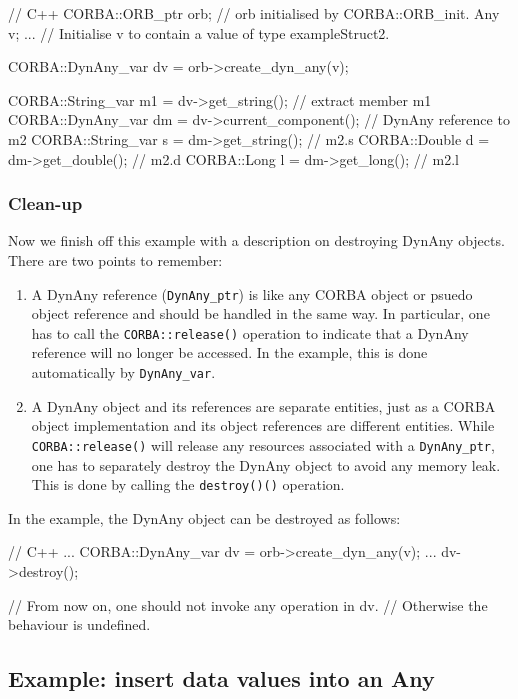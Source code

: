 \documentclass[11pt,twoside,a4paper]{book}
\newcommand{\type}[1]{\texttt{#1}}
\newcommand{\op}[1]{\texttt{#1()}}
\newcommand{\dsc}{\discretionary{}{}{}}
\begin{document}
\begin{cxxlisting}
// C++
CORBA::ORB_ptr orb;  // orb initialised by CORBA::ORB_init.
Any v;
...       // Initialise v to contain a value of type exampleStruct2.

CORBA::DynAny_var dv = orb->create_dyn_any(v);

CORBA::String_var m1 = dv->get_string();  // extract member m1
CORBA::DynAny_var dm = dv->current_component(); // DynAny reference to m2
CORBA::String_var s = dm->get_string();   // m2.s
CORBA::Double     d = dm->get_double();   // m2.d
CORBA::Long       l = dm->get_long();     // m2.l
\end{cxxlisting}


\subsubsection{Clean-up}
Now we finish off this example with a description on destroying DynAny
objects. There are two points to remember:

\begin{enumerate}
\item A DynAny reference (\type{DynAny\_ptr}) is like any CORBA object
or psuedo object reference and should be handled in the same way. In
particular, one has to call the \op{CORBA::release} operation to
indicate that a DynAny reference will no longer be accessed. In the
example, this is done automatically by \type{DynAny\_var}.

\item A DynAny object and its references are separate entities, just
as a CORBA object implementation and its object references are
different entities. While \op{CORBA::release} will release any
resources associated with a \type{DynAny\_\dsc{}ptr}, one has to
separately destroy the DynAny object to avoid any memory leak. This is
done by calling the \op{destroy()} operation.
\end{enumerate}

In the example, the DynAny object can be destroyed as follows:

\begin{cxxlisting}
// C++
...
CORBA::DynAny_var dv = orb->create_dyn_any(v);
...
dv->destroy();

// From now on, one should not invoke any operation in dv.
// Otherwise the behaviour is undefined.
\end{cxxlisting}


\subsection{Example: insert data values into an Any}
\end{document}
